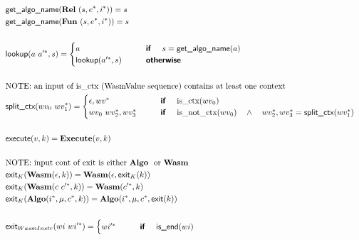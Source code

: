 \begin{align*}
%
\newline \\
  &\getalgoname(\rel ~ (s, \seq e, \seq i)) = s \\
  &\getalgoname(\fun ~ (s, \seq e, \seq i)) = s \\
%
\newline \\
  &\lookup(a ~ \seq{a'}, s) =
    \begin{cases}
      a &\quad\quad \premise{if}\quad ~ s = \getalgoname(a) \\
      \lookup(\seq{a'}, s) &\quad\quad \premise{otherwise}
    \end{cases}
  \\
%
\newline \\
&\text{NOTE: an input of is\_ctx (WasmValue sequence) contains at least one context} \\
  &\splitctx(wv_0 ~ \seq{wv_1}) =
    \begin{cases}
      \epsilon, \seq{wv} &\quad\quad \premise{if}\quad ~ \text{is\_ctx}(wv_0) \\
      wv_0 ~ \seq{wv_2}, \seq{wv_3} &\quad\quad \premise{if}\quad ~ \text{is\_not\_ctx}(wv_0) \quad\land\quad \seq{wv_2}, \seq{wv_3} = \splitctx(\seq{wv_1})
    \end{cases}
  \\
%
\newline \\
  &\execute(v, k) = \exe(v, k) \\
%
\newline \\
&\text{NOTE: input cont of exit is either \algo ~ or \wasm} \\
  &\exit_{K}(\wasm (\epsilon, k)) = \wasm(\epsilon, \exit_{K}(k)) \\
  &\exit_{K}(\wasm (c ~ \seq{c'}, k)) = \wasm(\seq{c'}, k) \\
  &\exit_{K}(\algo (\seq i, \mu, \seq c, k)) = \algo (\seq i, \mu, \seq c, \exit(k)) \\
%
\newline \\
  &\exit_{WasmInstr}(wi ~ \seq{wi'}) =
    \begin{cases}
      \seq{wi'} &\quad\quad \premise{if}\quad ~ \helper{is\_end}(wi) \\

\end{cases}
\end{align*}
